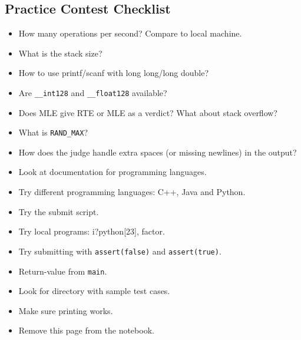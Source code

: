 \documentclass[11.5pt,a4paper,landscape,oneside]{amsart}
\begin{document}
\begin{multicols*}{2}
    \section*{Practice Contest Checklist}
        \begin{itemize}
            \item How many operations per second? Compare to local machine.
            \item What is the stack size?
            \item How to use printf/scanf with long long/long double?
            \item Are \texttt{\_{}\_{}int128} and \texttt{\_{}\_{}float128} available?
            \item Does MLE give RTE or MLE as a verdict? What about stack overflow?
            \item What is \texttt{RAND\_{}MAX}?
            \item How does the judge handle extra spaces (or missing newlines) in the output?
            \item Look at documentation for programming languages.
            \item Try different programming languages: C++, Java and Python.
            \item Try the submit script.
            \item Try local programs: i?python[23], factor.
            \item Try submitting with \texttt{assert(false)} and \texttt{assert(true)}.
            \item Return-value from \texttt{main}.
            \item Look for directory with sample test cases.
            \item Make sure printing works.

            \item Remove this page from the notebook.
        \end{itemize}

\end{multicols*}
\end{document}
